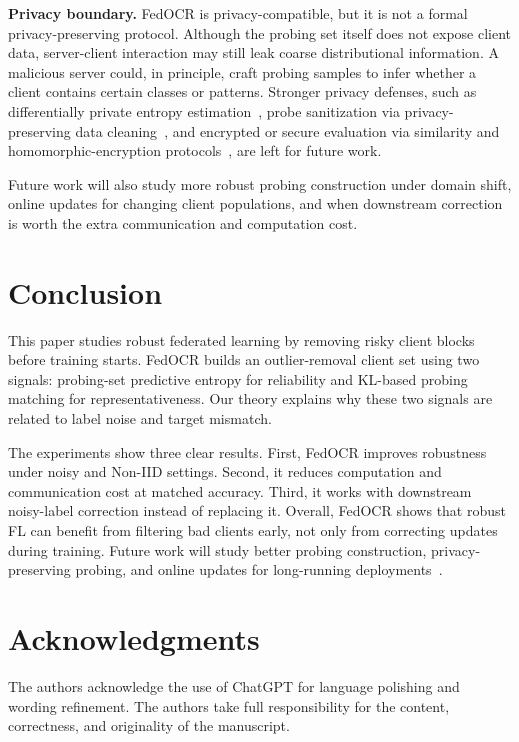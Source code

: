 ﻿\documentclass[conference]{IEEEtran}
\theoremstyle{definition}
\theoremstyle{remark}
\begin{document}
\textbf{Privacy boundary.} FedOCR is privacy-compatible, but it is not a formal privacy-preserving protocol. Although the probing set itself does not expose client data, server-client interaction may still leak coarse distributional information. A malicious server could, in principle, craft probing samples to infer whether a client contains certain classes or patterns. Stronger privacy defenses, such as differentially private entropy estimation~\cite{suresh2019dpanonymizedhistograms,to2019dplocationentropy}, probe sanitization via privacy-preserving data cleaning~\cite{krishnan2016privateclean}, and encrypted or secure evaluation via similarity and homomorphic-encryption protocols~\cite{blundo2014espresso,shen2024mkfhe,zhao2023treeinference}, are left for future work.

Future work will also study more robust probing construction under domain shift, online updates for changing client populations, and when downstream correction is worth the extra communication and computation cost.

\section{Conclusion}

This paper studies robust federated learning by removing risky client blocks before training starts.
FedOCR builds an outlier-removal client set using two signals: probing-set predictive entropy for reliability and KL-based probing matching for representativeness.
Our theory explains why these two signals are related to label noise and target mismatch.

The experiments show three clear results.
First, FedOCR improves robustness under noisy and Non-IID settings.
Second, it reduces computation and communication cost at matched accuracy.
Third, it works with downstream noisy-label correction instead of replacing it.
Overall, FedOCR shows that robust FL can benefit from filtering bad clients early, not only from correcting updates during training.
Future work will study better probing construction, privacy-preserving probing, and online updates for long-running deployments~\cite{kairouz2021advances,fu2023client}.

\section*{Acknowledgments}
The authors acknowledge the use of ChatGPT for language polishing and wording refinement. The authors take full responsibility for the content, correctness, and originality of the manuscript.



\end{document}
